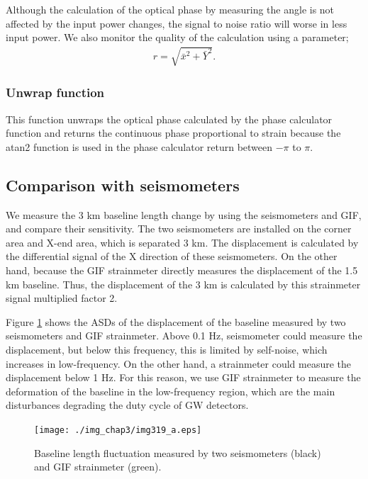 Although the calculation of the optical phase by measuring the angle is not affected by the input power changes, the signal to noise ratio will worse in less input power. We also monitor the quality of the calculation using a parameter;
\begin{eqnarray}
  r = \sqrt{\bar{x}^2+{\bar{Y}^2}}.
\end{eqnarray}

\subsubsection{Unwrap function}
This function unwraps the optical phase calculated by the phase calculator function and returns the continuous phase proportional to strain because the atan2 function is used in the phase calculator return between $-\pi$ to $\pi$. 

\subsection{Comparison with seismometers}
We measure the 3 km baseline length change by using the seismometers and GIF, and compare their sensitivity. The two seismometers are installed on the corner area and X-end area, which is separated 3 km. The displacement is calculated by the differential signal of the X direction of these seismometers. On the other hand, because the GIF strainmeter directly measures the displacement of the 1.5 km baseline. Thus, the displacement of the 3 km is calculated by this strainmeter signal multiplied factor 2.

Figure \ref{img:img319_a} shows the ASDs of the displacement of the baseline measured by two seismometers and GIF strainmeter. Above 0.1 Hz, seismometer could measure the displacement, but below this frequency, this is limited by self-noise, which increases in low-frequency. On the other hand, a strainmeter could measure the displacement below 1 Hz. For this reason, we use GIF strainmeter to measure the deformation of the baseline in the low-frequency region, which are the main disturbances degrading the duty cycle of GW detectors.

\begin{figure}[h]
    \begin{center}   
      \texttt{[image: ./img\_chap3/img319\_a.eps]}
      \caption{Baseline length fluctuation measured by two seismometers (black) and GIF strainmeter (green).}\label{img:img319_a}
    \end{center}
\end{figure}



